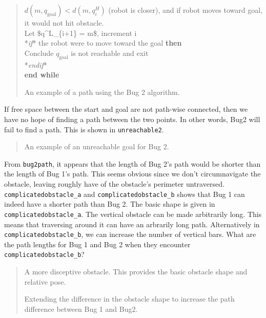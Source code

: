 \begin{quote}
\(d(m,q_{\text{goal}}) < d(m, q^H_{i})\) (robot is closer), and if robot
moves toward goal, it would not hit obstacle.\\
\hspace*{0.333em}\hspace*{0.333em}Let \$q\^{}L\_\{i+1\} = m\$, increment
i\\
\hspace*{0.333em}\hspace*{0.333em}*\emph{if}* the robot were to move
toward the goal \textbf{then}\\
\hspace*{0.333em}\hspace*{0.333em}\hspace*{0.333em}\hspace*{0.333em}Conclude
\(q_{\text{goal}}\) is not reachable and exit\\
\hspace*{0.333em}\hspace*{0.333em}*\emph{endif}*\\
\textbf{end while}

An example of a path using the Bug 2 algorithm.
\end{quote}

If free space between the start and goal are not path-wise connected,
then we have no hope of finding a path between the two points. In other
words, Bug2 will fail to find a path. This is shown in
\texttt{unreachable2}.

\begin{quote}
An example of an unreachable goal for Bug 2.
\end{quote}

From \texttt{bug2path}, it appears that the length of Bug 2's path would
be shorter than the length of Bug 1's path. This seems obvious since we
don't circumnavigate the obstacle, leaving roughly have of the
obstacle's perimeter untraversed. \texttt{complicatedobstacle\_a} and
\texttt{complicatedobstacle\_b} shows that Bug 1 can indeed have a
shorter path than Bug 2. The basic shape is given in
\texttt{complicatedobstacle\_a}. The vertical obstacle can be made
arbitrarily long. This means that traversing around it can have an
arbrarily long path. Alternatively in \texttt{complicatedobstacle\_b},
we can increase the number of vertical bars. What are the path lengths
for Bug 1 and Bug 2 when they encounter \texttt{complicatedobstacle\_b}?

\begin{quote}
A more disceptive obstacle. This provides the basic obstacle shape and
relative pose.

Extending the difference in the obstacle shape to increase the path
difference between Bug 1 and Bug2.
\end{quote}

